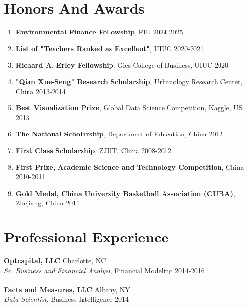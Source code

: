 \documentclass[margin,line]{resume}
\begin{document}
\begin{resume}
 	  \section{\mysidestyle Honors And Awards} 
 	  \begin{enumerate}[topsep=0pt, leftmargin=*]
    \item \textbf{Environmental Finance Fellowship}, FIU \hfill 2024-2025
 	     \item \textbf{List of "Teachers Ranked as Excellent"}, UIUC \hfill 2020-2021
 	     \item \textbf{Richard A. Erley Fellowship}, Gies College of Business, UIUC \hfill 2020
 	     \item \textbf{"Qian Xue-Seng" Research Scholarship}, Urbanology Research Center, China \hfill 2013-2014
 	     \item \textbf{Best Visualization Prize}, Global Data Science Competition, Kaggle, US  \hfill 2013
 	     \item \textbf{The National Scholarship}, Department of Education, China \hfill 2012
 	     \item \textbf{First Class Scholarship}, ZJUT, China \hfill  2008-2012
 	     \item \textbf{First Prize, Academic Science and Technology Competition}, China \hfill 2010-2011
 	     \item \textbf{Gold Medal, China University Basketball Association (CUBA)}, Zhejiang, China \hfill 2011
 	  \end{enumerate}
    
 	  \section{\mysidestyle Professional Experience} 
         \textbf{Optcapital, LLC} \hfill Charlotte, NC\\
         {\sl Sr. Business and Financial Analyst}, Financial Modeling \hfill 2014-2016\\
         \\
         \textbf{Facts and Measures, LLC} \hfill Albany, NY\\
         {\sl Data Scientist}, Business Intelligence \hfill 2014


\end{resume}
\end{document}
